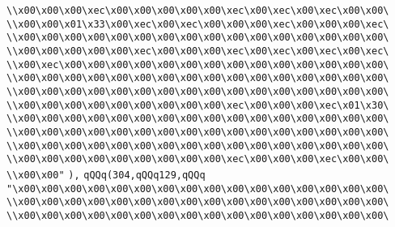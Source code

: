 \verb|\\x00\x00\x00\xec\x00\x00\x00\x00\x00\xec\x00\xec\x00\xec\x00\x00\|\newline
\verb|\\x00\x00\x01\x33\x00\xec\x00\xec\x00\x00\x00\xec\x00\x00\x00\xec\|\newline
\verb|\\x00\x00\x00\x00\x00\x00\x00\x00\x00\x00\x00\x00\x00\x00\x00\x00\|\newline
\verb|\\x00\x00\x00\x00\x00\xec\x00\x00\x00\xec\x00\xec\x00\xec\x00\xec\|\newline
\verb|\\x00\xec\x00\x00\x00\x00\x00\x00\x00\x00\x00\x00\x00\x00\x00\x00\|\newline
\verb|\\x00\x00\x00\x00\x00\x00\x00\x00\x00\x00\x00\x00\x00\x00\x00\x00\|\newline
\verb|\\x00\x00\x00\x00\x00\x00\x00\x00\x00\x00\x00\x00\x00\x00\x00\x00\|\newline
\verb|\\x00\x00\x00\x00\x00\x00\x00\x00\x00\xec\x00\x00\x00\xec\x01\x30\|\newline
\verb|\\x00\x00\x00\x00\x00\x00\x00\x00\x00\x00\x00\x00\x00\x00\x00\x00\|\newline
\verb|\\x00\x00\x00\x00\x00\x00\x00\x00\x00\x00\x00\x00\x00\x00\x00\x00\|\newline
\verb|\\x00\x00\x00\x00\x00\x00\x00\x00\x00\x00\x00\x00\x00\x00\x00\x00\|\newline
\verb|\\x00\x00\x00\x00\x00\x00\x00\x00\x00\xec\x00\x00\x00\xec\x00\x00\|\newline
\verb|\\x00\x00"|\newline
\verb|),|\newline
\verb|qQQq(304,qQQq129,qQQq|\newline
\verb|"\x00\x00\x00\x00\x00\x00\x00\x00\x00\x00\x00\x00\x00\x00\x00\x00\|\newline
\verb|\\x00\x00\x00\x00\x00\x00\x00\x00\x00\x00\x00\x00\x00\x00\x00\x00\|\newline
\verb|\\x00\x00\x00\x00\x00\x00\x00\x00\x00\x00\x00\x00\x00\x00\x00\x00\|\newline
